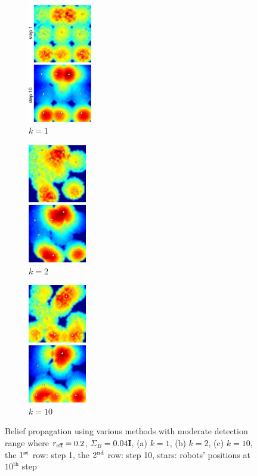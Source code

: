 \documentclass[letterpaper, 10 pt, conference]{ieeeconf}
\begin{document}
\begin{figure}
	\centering
	 \begin{subfigure}[b]{0.165\textwidth}
	 	\centering
		\includegraphics[width=1.093in]{figure/order1_step_0110_c}
		\caption{$k=1$}
	\end{subfigure}
	\begin{subfigure}[b]{0.15\textwidth}
		\centering
		\includegraphics[width=1in]{figure/order2_step_0110_c}
		\caption{$k=2$}
	\end{subfigure}
	 \begin{subfigure}[b]{0.15\textwidth}
	\centering
	\includegraphics[width=1in]{figure/ordern_step_0110_c}
	\caption{$k=10$}
\end{subfigure}
	\caption{Belief propagation using various methods with moderate detection range where $r_{\textup{eff}} = 0.2$, $\Sigma_B = 0.04\mathbf{I}$, (a) $k=1$, (b) $k=2$, (c) $k=10$, the $1^{\textup{st}}$ row: step 1, the $2^{\textup{nd}}$ row: step 10, stars: robots' positions at $10^{\text{th}}$ step}
	\label{fig:fig3}
\end{figure}
\end{document}
